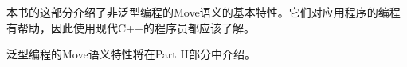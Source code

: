 本书的这部分介绍了非泛型编程的Move语义的基本特性。它们对应用程序的编程有帮助，因此使用现代C++的程序员都应该了解。\par

泛型编程的Move语义特性将在Part II部分中介绍。\par

\newpage